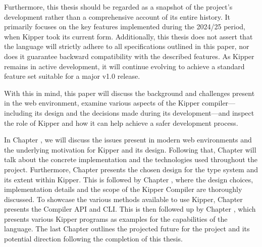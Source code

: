 Furthermore, this thesis should be regarded as a snapshot of the project's development rather than a comprehensive account of its entire history. It primarily focuses on the key features implemented during the 2024/25 period, when Kipper took its current form. Additionally, this thesis does not assert that the language will strictly adhere to all specifications outlined in this paper, nor does it guarantee backward compatibility with the described features. As Kipper remains in active development, it will continue evolving to achieve a standard feature set suitable for a major v1.0 release.

With this in mind, this paper will discuss the background and challenges present in the web environment, examine various aspects of the Kipper compiler—including its design and the decisions made during its development—and inspect the role of Kipper and how it can help achieve a safer development process.

In Chapter , we will discuss the issues present in modern web environments and the underlying motivation for Kipper and its design. Following that, Chapter  will talk about the concrete implementation and the technologies used throughout the project. Furthermore, Chapter  presents the chosen design for the type system and its extent within Kipper. This is followed by Chapter , where the design choices, implementation details and the scope of the Kipper Compiler are thoroughly discussed. To showcase the various methods available to use Kipper, Chapter  presents the Compiler API and CLI. This is then followed up by Chapter , which presents various Kipper programs as examples for the capabilities of the language. The last Chapter  outlines the projected future for the project and its potential direction following the completion of this thesis.

